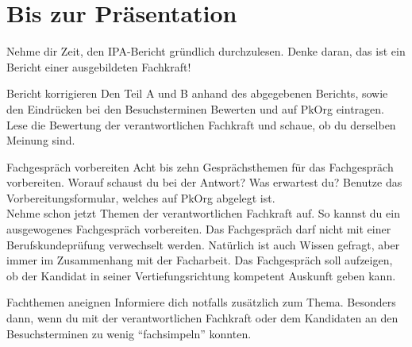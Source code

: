 \chapter{Bis zur Präsentation}
Nehme dir Zeit, den IPA-Bericht gründlich durchzulesen. Denke daran, das ist ein Bericht einer ausgebildeten Fachkraft!

\begin{taskitemwithoutcomment}{Bericht korrigieren}
  Den Teil A und B anhand des abgegebenen Berichts, sowie den Eindrücken bei den Besuchsterminen Bewerten und auf PkOrg eintragen. Lese die Bewertung der verantwortlichen Fachkraft und schaue, ob du derselben Meinung sind.
\end{taskitemwithoutcomment}
\begin{taskitemwithoutcomment}{Fachgespräch vorbereiten}
  Acht bis zehn Gesprächsthemen für das Fachgespräch vorbereiten. Worauf schaust du bei der Antwort? Was erwartest du? Benutze das Vorbereitungsformular, welches auf PkOrg abgelegt ist.\\ Nehme schon jetzt Themen der verantwortlichen Fachkraft auf. So kannst du ein ausgewogenes Fachgespräch vorbereiten. Das Fachgespräch darf nicht mit einer Berufskundeprüfung verwechselt werden. Natürlich ist auch Wissen gefragt, aber immer im Zusammenhang mit der Facharbeit. Das Fachgespräch soll aufzeigen, ob der Kandidat in seiner Vertiefungsrichtung kompetent Auskunft geben kann.
\end{taskitemwithoutcomment}
\begin{taskitem}{Fachthemen aneignen}
  Informiere dich notfalls zusätzlich zum Thema. Besonders dann, wenn du mit der verantwortlichen Fachkraft oder dem Kandidaten an den Besuchsterminen zu wenig \enquote{fachsimpeln} konnten.
\end{taskitem}
